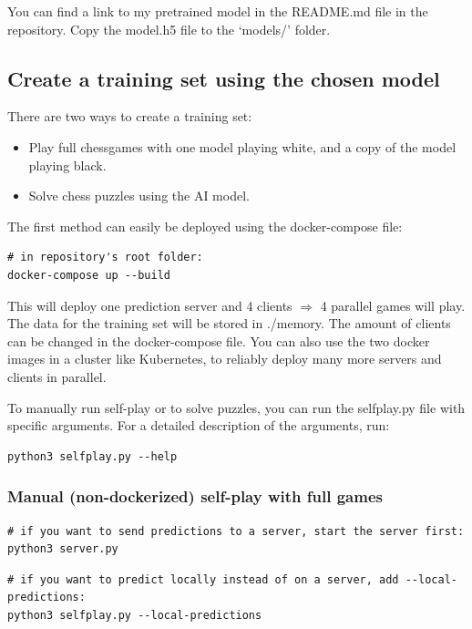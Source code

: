 \documentclass{article}
\begin{document}
You can find a link to my pretrained model in the README.md file in the repository.
Copy the model.h5 file to the `models/' folder.

\subsection{Create a training set using the chosen model}

There are two ways to create a training set:

\begin{itemize}
	\item Play full chessgames with one model playing white, and a copy of the model playing black.
	\item Solve chess puzzles using the AI model.
\end{itemize}

The first method can easily be deployed using the docker-compose file:

\begin{verbatim}
# in repository's root folder:
docker-compose up --build
\end{verbatim}

This will deploy one prediction server and 4 clients $\Rightarrow$ 4 parallel games will play. 
The data for the training set will be stored in ./memory.
The amount of clients can be changed in the docker-compose file. 
You can also use the two docker images in a cluster like Kubernetes, to
reliably deploy many more servers and clients in parallel.

To manually run self-play or to solve puzzles, you can run the selfplay.py file 
with specific arguments. For a detailed description of the arguments, run:

\begin{verbatim}
python3 selfplay.py --help
\end{verbatim}

\subsubsection{Manual (non-dockerized) self-play with full games}

\begin{verbatim}
# if you want to send predictions to a server, start the server first:
python3 server.py
\end{verbatim}


\begin{verbatim}
# if you want to predict locally instead of on a server, add --local-predictions:
python3 selfplay.py --local-predictions
\end{verbatim}
\end{document}
